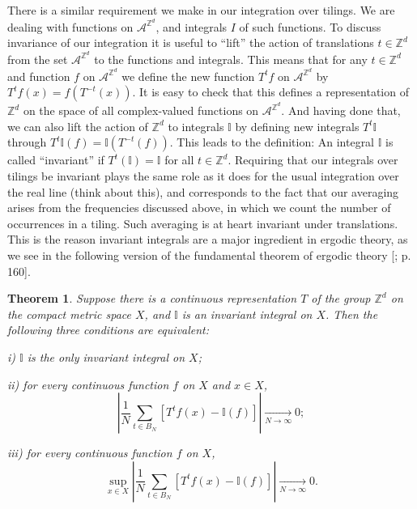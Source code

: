 \documentclass[reqno]{stml-l}
\theoremstyle{plain}
\newtheorem{theorem}{Theorem}[chapter]
\theoremstyle{definition}
\numberwithin{equation}{chapter}
\begin{document}
There is a similar requirement we make in our integration over tilings. We are dealing with functions on $\mathcal{A}^{\mathbb{Z}^{d}}$, and integrals $I$ of such functions. To discuss invariance of our integration it is useful to ``lift'' the action of translations $t\in \mathbb{Z}^{d}$ from the set $\mathcal{A}^{\mathbb{Z}^{d}}$ to the functions and integrals. This means that for any $t\in \mathbb{Z}^{d}$ and function $f$ on $\mathcal{A}^{\mathbb{Z}^{d}}$ we define the new function $T^{t}f$ on $\mathcal{A}^{\mathbb{Z}^{d}}$ by $T^{t}f(x)=f(T^{-t}(x))$. It is easy to check that this defines a representation of $\mathbb{Z}^{d}$ on the space of all complex-valued functions on $\mathcal{A}^{\mathbb{Z}^{d}}$. And having done that, we can also lift the action of $\mathbb{Z}^{d}$ to integrals $\mathbb{I}$ by defining new integrals $T^{t} \mathbb{I}$ through $T^{t} \mathbb{I}(f)= \mathbb{I}(T^{-t}(f))$. This leads to the definition: An integral $\mathbb{I}$ is called ``invariant'' if $T^{t}(\mathbb{I})=\mathbb{I}$
for all $t\in \mathbb{Z}^{d}$. Requiring that our
integrals over tilings be invariant plays the same role as it does for the usual integration over the real line (think about this), and corresponds to the fact that our averaging arises from the frequencies discussed above, in which we count the number of occurrences in a tiling. Such averaging is at heart invariant under translations. This is the reason invariant integrals are a major ingredient in ergodic theory, as we see in the following version of the fundamental theorem of ergodic theory [; p. 160].

\begin{theorem}\label{ch01:thm1.2}
Suppose there is a continuous representation $T$ of the group $\mathbb{Z}^{d}$ on the compact metric space $X$, and $\mathbb{I}$ is an invariant integral on $X$. Then the following three conditions are equivalent:


i) $\mathbb{I}$ is the only invariant integral on $X$;

ii) for every continuous function $f$ on $X$ and $x\in X$,
\begin{equation}
|\frac{1}{N}\sum\limits_{t\in B_{N}}[T^{t}f(x)-\mathbb{I}(f)]|\underset{N\rightarrow\infty}{\longrightarrow}0;\label{ch01:eqn1.7}
\end{equation}

iii) for every continuous function $f$ on $X$,
\begin{equation}
\sup\limits_{x\in X}|\frac{1}{N}\sum\limits_{t\in B_{N}}[T^{t}f(x)-\mathbb{I}(f)]|\underset{N\rightarrow\infty}{\longrightarrow}0.\label{ch01:eqn:1.8}
\end{equation}
\end{theorem}
\end{document}
